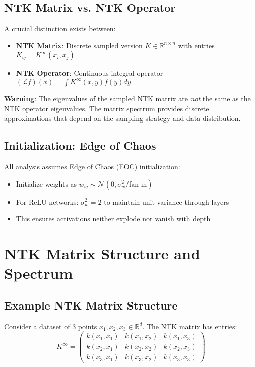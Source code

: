 \documentclass{article}
\begin{document}
\subsection{NTK Matrix vs. NTK Operator}

A crucial distinction exists between:
\begin{itemize}
\item \textbf{NTK Matrix}: Discrete sampled version $K \in \mathbb{R}^{n \times n}$ with entries $K_{ij} = K^{\infty}(x_i, x_j)$
\item \textbf{NTK Operator}: Continuous integral operator $(\mathcal{L}f)(x) = \int K^{\infty}(x,y)f(y)dy$
\end{itemize}

\textbf{Warning}: The eigenvalues of the sampled NTK matrix are \emph{not} the same as the NTK operator eigenvalues. The matrix spectrum provides discrete approximations that depend on the sampling strategy and data distribution.

\subsection{Initialization: Edge of Chaos}

All analysis assumes Edge of Chaos (EOC) initialization:
\begin{itemize}
\item Initialize weights as $w_{ij} \sim \mathcal{N}(0, \sigma_w^2/\text{fan-in})$ 
\item For ReLU networks: $\sigma_w^2 = 2$ to maintain unit variance through layers
\item This ensures activations neither explode nor vanish with depth
\end{itemize}

\newpage

\section{NTK Matrix Structure and Spectrum}

\subsection{Example NTK Matrix Structure}

Consider a dataset of 3 points $x_1, x_2, x_3 \in \mathbb{R}^d$. The NTK matrix has entries:
\[
K^{\infty} = \begin{pmatrix} 
k(x_1,x_1) & k(x_1,x_2) & k(x_1,x_3) \\
k(x_2,x_1) & k(x_2,x_2) & k(x_2,x_3) \\
k(x_3,x_1) & k(x_3,x_2) & k(x_3,x_3)
\end{pmatrix}
\]
\end{document}
